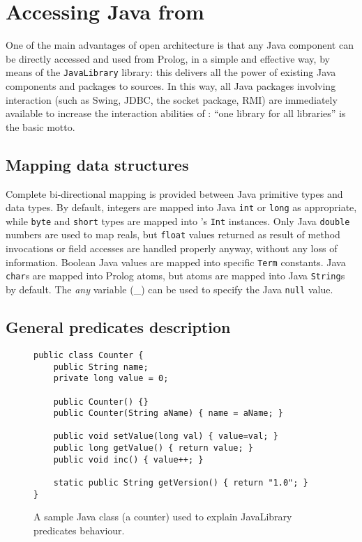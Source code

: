 \chapter{Accessing Java from \tuprolog{}}
\label{java-library}
One of the main advantages of \tuprolog{} open architecture is
that any Java component can be directly accessed and used from
Prolog, in a simple and effective way, by means of the
\texttt{JavaLibrary} library: this delivers all the power of
existing Java components and packages to \tuprolog{} sources.
%
In this way, all Java packages involving interaction (such as Swing,
JDBC, the socket package, RMI) are immediately available to increase
the interaction abilities of \tuprolog:
%
{``one library for all libraries''} is the basic motto.
%
%
\section{Mapping data structures}

Complete bi-directional mapping is provided between Java primitive
types and \tuprolog{} data types.
%
By default, \tuprolog{} integers are mapped into Java \texttt{int}
or \texttt{long} as appropriate, while \texttt{byte} and
\texttt{short} types are mapped into \tuprolog{}'s \texttt{Int}
instances. Only Java \texttt{double} numbers are used to map
\tuprolog{} reals, but \texttt{float} values returned as result of
method invocations or field accesses are handled properly anyway,
without any loss of information.
%
Boolean Java values are mapped into specific \tuprolog{}
\texttt{Term} constants.
%
Java \texttt{char}s are mapped into Prolog atoms, but atoms are
mapped into Java \texttt{String}s by default.
%
The \emph{any} variable (\_) can be used to specify the Java
\texttt{null} value.

\section{General predicates description}

\begin{figure}
\caption{A sample Java class (a counter) used to explain JavaLibrary predicates behaviour.
}
\begin{verbatim}
public class Counter {
    public String name;
    private long value = 0;

    public Counter() {}
    public Counter(String aName) { name = aName; }

    public void setValue(long val) { value=val; }
    public long getValue() { return value; }
    public void inc() { value++; }

    static public String getVersion() { return "1.0"; }
}
\end{verbatim}
\end{figure}


